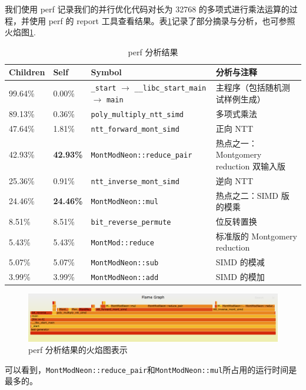 \documentclass[a4paper]{article}
\begin{document}
我们使用 perf 记录我们的并行优化代码对长为 32768 的多项式进行乘法运算的过程，并使用 perf 的 report 工具查看结果。表\ref{t2}记录了部分摘录与分析，也可参照火焰图\ref{fig:enter-label}.

\begin{table}[h]
\centering
\begin{tabular}{|l|l|l|l|}
\hline
Children & Self & Symbol & 分析与注释 \\ \hline
99.64\% & 0.00\% & \texttt{\_start} $\rightarrow$ \texttt{\_\_libc\_start\_main} $\rightarrow$ \texttt{main} & 主程序（包括随机测试样例生成） \\ \hline
89.13\% & 0.36\% & \texttt{poly\_multiply\_ntt\_simd} & 多项式乘法 \\ \hline
47.64\% & 1.81\% & \texttt{ntt\_forward\_mont\_simd} & 正向 NTT \\ \hline
42.93\% & \textbf{42.93\%} & \texttt{MontModNeon::reduce\_pair} & 热点之一：Montgomery reduction 双输入版 \\ \hline
25.36\% & 0.91\% & \texttt{ntt\_inverse\_mont\_simd} & 逆向 NTT \\ \hline
24.46\% & \textbf{24.46\%} & \texttt{MontModNeon::mul} & 热点之二：SIMD 版的模乘 \\ \hline
8.51\% & 8.51\% & \texttt{bit\_reverse\_permute} & 位反转置换 \\ \hline
5.43\% & 5.43\% & \texttt{MontMod::reduce} & 标准版的 Montgomery reduction \\ \hline
5.07\% & 5.07\% & \texttt{MontModNeon::sub} & SIMD 的模减 \\ \hline
3.99\% & 3.99\% & \texttt{MontModNeon::add} & SIMD 的模加 \\ \hline
\end{tabular}
\caption{perf 分析结果}
\label{t2}
\end{table}

\begin{figure}
    \centering
    \includegraphics[width=1\linewidth]{image/3.png}
    \caption{perf 分析结果的火焰图表示}
    \label{fig:enter-label}
\end{figure}

可以看到，\texttt{MontModNeon::reduce\_pair}和\texttt{MontModNeon::mul}所占用的运行时间是最多的。
\end{document}
